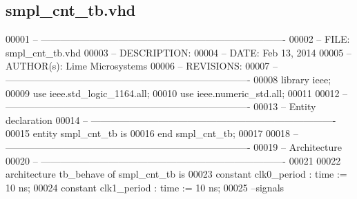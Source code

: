 \subsection{smpl\+\_\+cnt\+\_\+tb.\+vhd}
\label{smpl__cnt__tb_8vhd_source}

\begin{DoxyCode}
00001 \textcolor{keyword}{-- ---------------------------------------------------------------------------- }
00002 \textcolor{keyword}{-- FILE:    smpl\_cnt\_tb.vhd}
00003 \textcolor{keyword}{-- DESCRIPTION: }
00004 \textcolor{keyword}{-- DATE:    Feb 13, 2014}
00005 \textcolor{keyword}{-- AUTHOR(s):   Lime Microsystems}
00006 \textcolor{keyword}{-- REVISIONS:}
00007 \textcolor{keyword}{-- ---------------------------------------------------------------------------- }
00008 \textcolor{vhdlkeyword}{library }\textcolor{keywordflow}{ieee};
00009 \textcolor{vhdlkeyword}{use }ieee.std\_logic\_1164.\textcolor{keywordflow}{all};
00010 \textcolor{vhdlkeyword}{use }ieee.numeric\_std.\textcolor{keywordflow}{all};
00011 
00012 \textcolor{keyword}{-- ----------------------------------------------------------------------------}
00013 \textcolor{keyword}{-- Entity declaration}
00014 \textcolor{keyword}{-- ----------------------------------------------------------------------------}
00015 \textcolor{keywordflow}{entity }smpl_cnt_tb \textcolor{keywordflow}{is}
00016 \textcolor{keywordflow}{end} \textcolor{vhdlchar}{smpl\_cnt\_tb};
00017 
00018 \textcolor{keyword}{-- ----------------------------------------------------------------------------}
00019 \textcolor{keyword}{-- Architecture}
00020 \textcolor{keyword}{-- ----------------------------------------------------------------------------}
00021 
00022 \textcolor{keywordflow}{architecture} tb\_behave \textcolor{keywordflow}{of} smpl_cnt_tb is
00023    \textcolor{keywordflow}{constant} \textcolor{vhdlchar}{clk0_period}   \textcolor{vhdlchar}{:} \textcolor{comment}{time} \textcolor{vhdlchar}{:=} \textcolor{vhdllogic}{}\textcolor{vhdllogic}{10} \textcolor{vhdlchar}{ns};
00024    \textcolor{keywordflow}{constant} \textcolor{vhdlchar}{clk1_period}   \textcolor{vhdlchar}{:} \textcolor{comment}{time} \textcolor{vhdlchar}{:=} \textcolor{vhdllogic}{}\textcolor{vhdllogic}{10} \textcolor{vhdlchar}{ns}; 
00025 \textcolor{keyword}{   --signals}

\end{DoxyCode}

